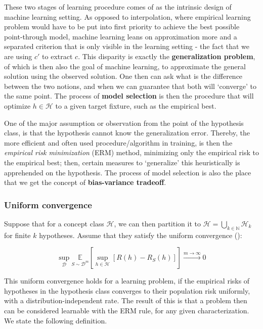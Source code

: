 \documentclass[10pt]{article}
\begin{document}
These two stages of learning procedure comes of as the intrinsic design of machine learning setting. As opposed to interpolation, where empirical learning problem would have to be put into first priority to achieve the best possible point-through model, machine learning leans on approximation more and a separated criterion that is only visible in the learning setting - the fact that we are using $c'$ to extract $c$. This disparity is exactly the \textbf{generalization problem}, of which is then also the goal of machine learning, to approximate the general solution using the observed solution. One then can ask what is the difference between the two notions, and when we can guarantee that both will `converge' to the same point. The process of \textbf{model selection} is then the procedure that will optimize $h\in \mathcal{H}$ to a given target fixture, such as the empirical best. 

One of the major assumption or observation from the point of the hypothesis class, is that the hypothesis cannot know the generalization error. Thereby, the more efficient and often used procedure/algorithm in training, is then the \textit{empirical risk minimization} (ERM) method, minimizing only the empirical risk to the empirical best; then, certain measures to `generalize' this heuristically is apprehended on the hypothesis. The process of model selection is also the place that we get the concept of \textbf{bias-variance tradeoff}. 
\subsubsection{Uniform convergence}

Suppose that for a concept class $\mathcal{H}$, we can then partition it to $\mathcal{H}=\bigcup_{k\in \mathbb{N}} \mathcal{H}_{k}$ for finite $k$ hypotheses. Assume that they satisfy the uniform convergence (\cite{JMLR:v11:shalev-shwartz10a}): 

\begin{equation}
    \sup_{\mathcal{D}} \underset{S\sim\mathcal{D}^{m}}{\mathbb{E}} \left[ \sup_{h\in\mathcal{H}} [R(h) - R_{S}(h)] \right] \overset{m\to\infty}{\longrightarrow} 0
\end{equation}

This uniform convergence holds for a learning problem, if the empirical risks of hypotheses in the hypothesis class converges to their population risk uniformly, with a distribution-independent rate. The result of this is that a problem then can be considered learnable with the ERM rule, for any given characterization. We state the following definition.
\end{document}
